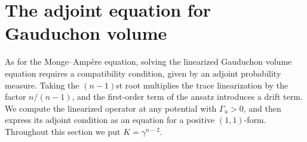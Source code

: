 \section{The adjoint equation for Gauduchon volume}
\label{sec:gauduchon-volume-adjoint}

As for the Monge--Amp\`ere equation, solving the linearized Gauduchon volume equation requires a compatibility condition, given by an adjoint probability measure. Taking the $(n-1)$st root multiplies the trace linearization by the factor $n/(n-1)$, and the first-order term of the ansatz introduces a drift term. We compute the linearized operator at any potential with $\Gamma_u>0$, and then express its adjoint condition as an equation for a positive $(1,1)$-form. Throughout this section we put $K=\gamma^{n-2}$.


